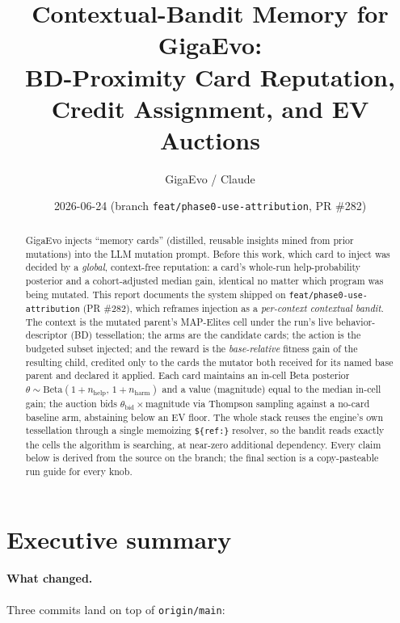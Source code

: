 \documentclass[11pt]{article}
\title{\textbf{Contextual-Bandit Memory for GigaEvo:\\
BD-Proximity Card Reputation, Credit Assignment, and EV Auctions}}
\author{GigaEvo / Claude}
\date{2026-06-24 \quad (branch \texttt{feat/phase0-use-attribution}, PR \#282)}
\newcommand{\code}[1]{\texttt{#1}}
\begin{document}
\maketitle

\begin{abstract}
GigaEvo injects ``memory cards'' (distilled, reusable insights mined from prior
mutations) into the LLM mutation prompt. Before this work, which card to inject
was decided by a \emph{global}, context-free reputation: a card's whole-run
help-probability posterior and a cohort-adjusted median gain, identical no matter
which program was being mutated. This report documents the system shipped on
\code{feat/phase0-use-attribution} (PR \#282), which reframes injection as a
\emph{per-context contextual bandit}. The context is the mutated parent's
MAP-Elites cell under the run's live behavior-descriptor (BD) tessellation; the
arms are the candidate cards; the action is the budgeted subset injected; and the
reward is the \emph{base-relative} fitness gain of the resulting child, credited
only to the cards the mutator both received for its named base parent and declared
it applied. Each card maintains an in-cell Beta posterior
$\theta\!\sim\!\mathrm{Beta}(1+n_{\text{help}},\,1+n_{\text{harm}})$ and a value
(magnitude) equal to the median in-cell gain; the auction bids
$\theta_{\text{bid}}\!\times\!\text{magnitude}$ via Thompson sampling against a
no-card baseline arm, abstaining below an EV floor. The whole stack reuses the
engine's own tessellation through a single memoizing \code{\$\{ref:\}} resolver,
so the bandit reads exactly the cells the algorithm is searching, at near-zero
additional dependency. Every claim below is derived from the source on the branch;
the final section is a copy-pasteable run guide for every knob.
\end{abstract}

\section{Executive summary}

\paragraph{What changed.} Three commits land on top of \code{origin/main}:
\end{document}
